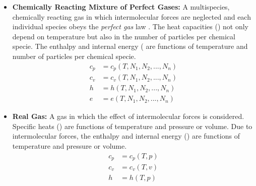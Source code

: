 \begin{itemize}
\begin{subequations}
            \end{subequations}
            \item \textbf{Chemically Reacting Mixture of Perfect Gases:} A
                multispecies, chemically reacting gas in which intermolecular
                forces are neglected and each individual species obeys the
                \textit{perfect gas} law . The heat
                capacities
                ()
                not only depend on temperature but also in the number of
                particles per chemical specie. The enthalpy and internal energy
                (
                are functions of temperature and number of particles per
                chemical specie.
            \begin{subequations}\label{eq:chemicallyReactingGasAssumptions}
                \begin{align}
                    c_p &= c_p(T,N_1,N_2,...,N_n) \label{eq:chemicallyReactingHeatCapP} \\
                    c_v &= c_v(T,N_1,N_2,...,N_n) \label{eq:chemicallyReactingHeatCapV} \\
                    h & = h(T,N_1,N_2,...,N_n) \label{eq:chemicallyReactingGasEnthalpy} \\
                    e & = e(T,N_1,N_2,...,N_n) \label{eq:chemicallyReactingGasEnergy} 
                \end{align}
            \end{subequations}
            \item \textbf{Real Gas:} A gas in which the effect of
                intermolecular forces is considered. Specific heats
                () are functions of
                temperature and pressure or volume. Due to intermolecular
                forces, the enthalpy and internal energy
                () are functions of
                temperature and pressure or volume. 
            \begin{subequations}\label{eq:realGasAssumptions}
                \begin{align}
                    c_p &= c_p(T,p) \label{eq:realHeatCapP} \\
                    c_v &= c_v(T,v) \label{eq:realHeatCapV} \\
                    h & = h(T,p) \label{eq:realGasEnthalpy} \\

\end{align}
\end{subequations}
\end{itemize}
